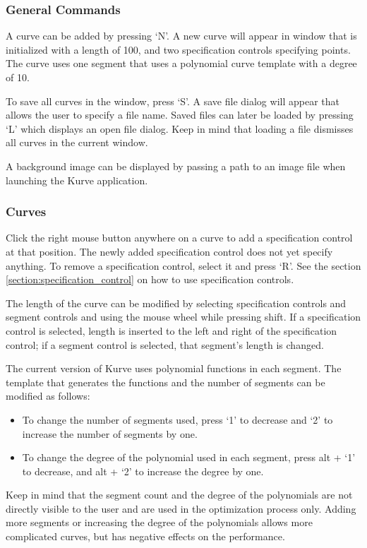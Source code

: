 \documentclass[a4paper]{article}
\begin{document}
				\subsubsection{General Commands}
				
					A curve can be added by pressing `N'. A new curve will appear in window that is initialized with a length of 100, and two specification controls specifying points. The curve uses one segment that uses a polynomial curve template with a degree of 10.
					
					To save all curves in the window, press `S'. A save file dialog will appear that allows the user to specify a file name. Saved files can later be loaded by pressing `L' which displays an open file dialog. Keep in mind that loading a file dismisses all curves in the current window.
					
					A background image can be displayed by passing a path to an image file when launching the Kurve application.
					
				\subsubsection{Curves}
					
					Click the right mouse button anywhere on a curve to add a specification control at that position. The newly added specification control does not yet specify anything. To remove a specification control, select it and press `R'. See the section \ref{section:specification_control} on how to use specification controls. 
					
					The length of the curve can be modified by selecting specification controls and segment controls and using the mouse wheel while pressing shift. If a specification control is selected, length is inserted to the left and right of the specification control; if a segment control is selected, that segment's length is changed.
					
					The current version of Kurve uses polynomial functions in each segment. The template that generates the functions and the number of segments can be modified as follows:
					
					\begin{itemize}
						\item To change the number of segments used, press `1' to decrease and `2' to increase the number of segments by one.
						\item To change the degree of the polynomial used in each segment, press alt + `1' to decrease, and alt + `2' to increase the degree by one.
					\end{itemize}
					Keep in mind that the segment count and the degree of the polynomials are not directly visible to the user and are used in the optimization process only. Adding more segments or increasing the degree of the polynomials allows more complicated curves, but has negative effects on the performance.
\end{document}
